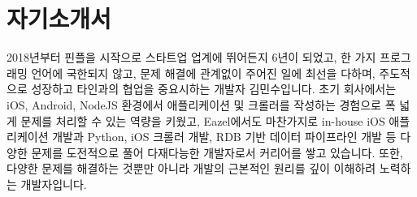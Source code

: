 \section{자기소개서}
    \begin{itemize}[leftmargin=0.15in, label={}]
    \small{\item{2018년부터 핀플을 시작으로 스타트업 업계에 뛰어든지 6년이 되었고, 한 가지 프로그래밍 언어에 국한되지 않고, 문제 해결에 관계없이 주어진 일에 최선을 다하며, 주도적으로 성장하고 타인과의 협업을 중요시하는 개발자 김민수입니다. 초기 회사에서는 iOS, Android, NodeJS 환경에서 애플리케이션 및 크롤러를 작성하는 경험으로 폭 넓게 문제를 처리할 수 있는 역량을 키웠고, Eazel에서도 마찬가지로 in-house iOS 애플리케이션 개발과 Python, iOS 크롤러 개발, RDB 기반 데이터 파이프라인 개발 등 다양한 문제를 도전적으로 풀어 다재다능한 개발자로서 커리어를 쌓고 있습니다. 또한, 다양한 문제를 해결하는 것뿐만 아니라 개발의 근본적인 원리를 깊이 이해하려 노력하는 개발자입니다.}}
    \end{itemize}